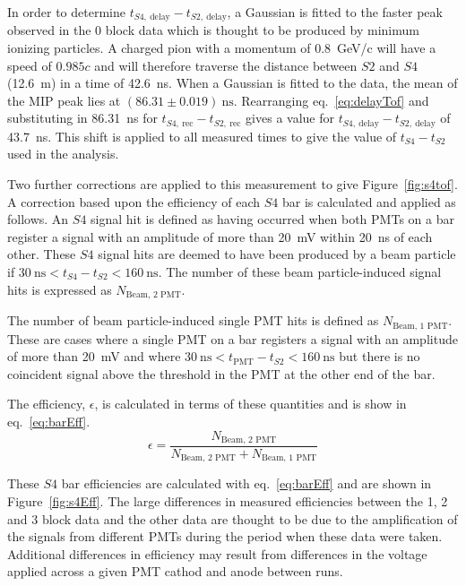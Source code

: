 In order to determine $t_{\mathit{S4},~\text{delay}} - t_{\mathit{S2},~\text{delay}}$, a Gaussian is fitted to the faster peak observed in the 0 block data which is thought to be produced by minimum ionizing particles.
A charged pion with a momentum of 0.8~GeV/c will have a speed of $0.985c$ and will therefore traverse the distance between $\mathit{S2}$ and $\mathit{S4}$ (12.6~m) in a time of 42.6~ns.
When a Gaussian is fitted to the data, the mean of the MIP peak lies at $(86.31 \pm 0.019)~\text{ns}$.
Rearranging eq.~\ref{eq:delayTof} and substituting in 86.31~ns for $t_{\mathit{S4},~\text{rec}} - t_{\mathit{S2},~\text{rec}}$ gives a value for $t_{\mathit{S4},~\text{delay}} - t_{\mathit{S2},~\text{delay}}$ of 43.7~ns.
This shift is applied to all measured times to give the value of $t_{\mathit{S4}} - t_{\mathit{S2}}$ used in the analysis.


Two further corrections are applied to this measurement to give Figure~\ref{fig:s4tof}.
A correction based upon the efficiency of each $\mathit{S4}$ bar is calculated and applied as follows.
An $\mathit{S4}$ signal hit is defined as having occurred when both PMTs on a bar register a signal with an amplitude of more than 20~mV within 20~ns of each other.
These $\mathit{S4}$ signal hits are deemed to have been produced by a beam particle if $30~\text{ns} < t_{\mathit{S4}} - t_{\mathit{S2}} < 160~\text{ns}$.
The number of these beam particle-induced signal hits is expressed as $N_{\text{Beam, 2 PMT}}$.

The number of beam particle-induced single PMT hits is defined as $N_{\text{Beam, 1 PMT}}$.
These are cases where a single PMT on a bar registers a signal with an amplitude of more than 20~mV and where $30~\text{ns} < t_{\text{PMT}} - t_{\mathit{S2}} < 160~\text{ns}$ but there is no coincident signal above the threshold in the PMT at the other end of the bar.

The efficiency, $\epsilon$, is calculated in terms of these quantities and is show in eq.~\ref{eq:barEff}.
\begin{equation}
  \epsilon = \frac{N_{\text{Beam, 2 PMT}}}{N_{\text{Beam, 2 PMT}}+N_{\text{Beam, 1 PMT}}}
  \label{eq:barEff}
\end{equation}

These $\mathit{S4}$ bar efficiencies are calculated with eq.~\ref{eq:barEff} and are shown in Figure~\ref{fig:s4Eff}.
The large differences in measured efficiencies between the 1, 2 and 3 block data and the other data are thought to be due to the amplification of the signals from different PMTs during the period when these data were taken.
Additional differences in efficiency may result from differences in the voltage applied across a given PMT cathod and anode between runs.

